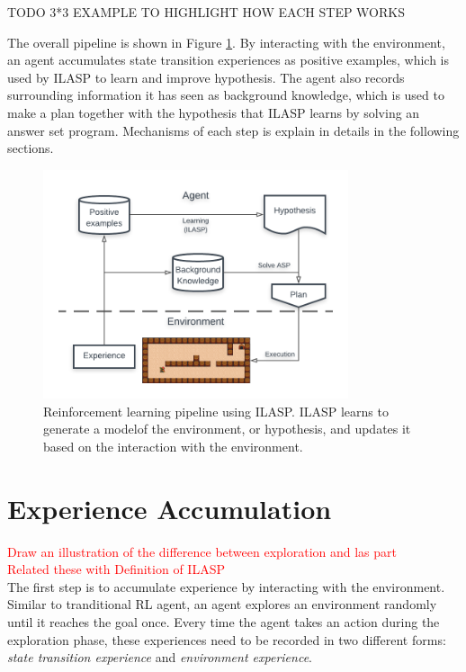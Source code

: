 TODO 3*3 EXAMPLE TO HIGHLIGHT HOW EACH STEP WORKS

The overall pipeline is shown in Figure \ref{fig:pipeline}. By interacting with the environment, an agent accumulates state transition experiences as positive examples, which is used by ILASP to learn and improve hypothesis.
The agent also records surrounding information it has seen as background knowledge, which is used to make a plan together with the hypothesis that ILASP learns by solving an answer set program. 
Mechanisms of each step is explain in details in the following sections. 

\begin{figure}[!htb]
\centering
\includegraphics[width=0.8\textwidth]{./figures/architecture}
\caption{Reinforcement learning pipeline using ILASP. ILASP learns to generate a modelof the environment, or hypothesis, and updates it based on the interaction with the environment. }
\label{fig:pipeline}
\end{figure}

\section{Experience Accumulation}
\label{experience_accumulation}
\textcolor{red}{Draw an illustration of the difference between exploration and las part}\\
\textcolor{red}{Related these with Definition of ILASP}\\
The first step is to accumulate experience by interacting with the environment. Similar to tranditional RL agent, an agent explores an environment randomly until it reaches the goal once. 
Every time the agent takes an action during the exploration phase, these experiences need to be recorded in two different forms: \textit{state transition experience} and \textit{environment experience}.

